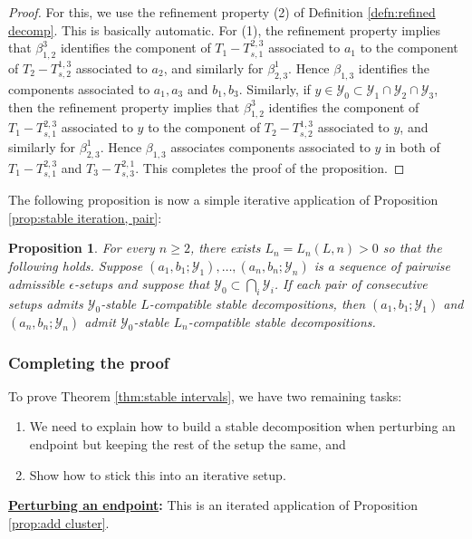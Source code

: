 \documentclass{amsart}
\newtheorem{proposition}[theorem]{Proposition}
\theoremstyle{definition}
\theoremstyle{remark}
\theoremstyle{definition}
\newcommand{\calY}{\mathcal{Y}}
\begin{document}
\begin{proof}
For this, we use the refinement property (2) of Definition \ref{defn:refined decomp}.  This is basically automatic.  For (1), the refinement property implies that $\beta^3_{1,2}$ identifies the component of $T_1 - T^{2,3}_{s,1}$ associated to $a_1$ to the component of $T_2 - T^{1,3}_{s,2}$ associated to $a_2$, and similarly for $\beta^1_{2,3}$.  Hence $\beta_{1,3}$ identifies the components associated to $a_1, a_3$ and $b_1,b_3$.  Similarly, if $y \in \calY_0 \subset \calY_1 \cap \calY_2 \cap \calY_3$, then the refinement property implies that $\beta^3_{1,2}$ identifies the component of $T_1 - T^{2,3}_{s,1}$ associated to $y$ to the component of $T_2 - T^{1,3}_{s,2}$ associated to $y$, and similarly for $\beta^1_{2,3}$.  Hence $\beta_{1,3}$ associates components associated to $y$ in both of $T_1 - T^{2,3}_{s,1}$ and $T_3 - T^{2,1}_{s,3}$.  This completes the proof of the proposition.



\end{proof}

The following proposition is now a simple iterative application of Proposition \ref{prop:stable iteration, pair}:

\begin{proposition}\label{prop:stable iteration}
For every $n\geq 2$, there exists $L_n = L_n(L,n)>0$ so that the following holds.  Suppose $(a_1,b_1;\calY_1), \dots, (a_n,b_n;\calY_n)$ is a sequence of pairwise admissible $\epsilon$-setups and suppose that $\calY_0 \subset \bigcap_i \calY_i$.  If each pair of consecutive setups admits $\calY_0$-stable $L$-compatible stable decompositions, then $(a_1,b_1;\calY_1)$ and $(a_n,b_n;\calY_n)$ admit $\calY_0$-stable $L_n$-compatible stable decompositions. 
\end{proposition}


\subsubsection{Completing the proof} To prove Theorem \ref{thm:stable intervals}, we have two remaining tasks:
\begin{enumerate}
\item We need to explain how to build a stable decomposition when perturbing an endpoint but keeping the rest of the setup the same, and
\item Show how to stick this into an iterative setup.
\end{enumerate}

\textbf{\underline{Perturbing an endpoint}:} This is an iterated application of  Proposition \ref{prop:add cluster}.
\end{document}
